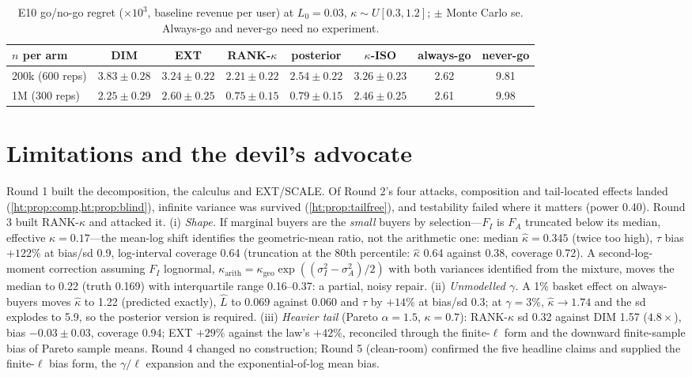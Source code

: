 \begin{table}[htbp]
\centering\small
\caption{E10 go/no-go regret ($\times 10^3$, baseline revenue per user) at $L_0 = 0.03$, $\kappa \sim U[0.3, 1.2]$; $\pm$ Monte Carlo se. Always-go and never-go need no experiment.}
\label{ht:tab:regret}
\begin{tabular}{lccccccc}
\toprule
$n$ per arm & DIM & EXT & RANK-$\kappa$ & posterior & $\kappa$-ISO & always-go & never-go \\
\midrule
200k (600 reps) & $3.83 \pm 0.28$ & $3.24 \pm 0.22$ & $\mathbf{2.21 \pm 0.22}$ & $2.54 \pm 0.22$ & $3.26 \pm 0.23$ & 2.62 & 9.81 \\
1M (300 reps) & $2.25 \pm 0.29$ & $2.60 \pm 0.25$ & $\mathbf{0.75 \pm 0.15}$ & $0.79 \pm 0.15$ & $2.46 \pm 0.25$ & 2.61 & 9.98 \\
\bottomrule
\end{tabular}
\end{table}

\section{Limitations and the devil's advocate}

Round 1 built the decomposition, the calculus and EXT/SCALE. Of Round 2's four attacks, composition and tail-located effects landed (\cref{ht:prop:comp,ht:prop:blind}), infinite variance was survived (\cref{ht:prop:tailfree}), and testability failed where it matters (power 0.40). Round 3 built RANK-$\kappa$ and attacked it. (i) \emph{Shape.} If marginal buyers are the \emph{small} buyers by selection---$F_I$ is $F_A$ truncated below its median, effective $\kappa = 0.17$---the mean-log shift identifies the geometric-mean ratio, not the arithmetic one: median $\hat\kappa = 0.345$ (twice too high), $\tau$ bias $+122\%$ at bias/sd 0.9, log-interval coverage 0.64 (truncation at the 80th percentile: $\hat\kappa$ 0.64 against 0.38, coverage 0.72). A second-log-moment correction assuming $F_I$ lognormal, $\kappa_{\mathrm{arith}} = \kappa_{\mathrm{geo}}\exp((\sigma_I^2 - \sigma_A^2)/2)$ with both variances identified from the mixture, moves the median to 0.22 (truth 0.169) with interquartile range 0.16--0.37: a partial, noisy repair. (ii) \emph{Unmodelled $\gamma$.} A 1\% basket effect on always-buyers moves $\hat\kappa$ to 1.22 (predicted exactly), $\hat L$ to 0.069 against 0.060 and $\tau$ by $+14\%$ at bias/sd 0.3; at $\gamma = 3\%$, $\hat\kappa \to 1.74$ and the sd explodes to 5.9, so the posterior version is required. (iii) \emph{Heavier tail} (Pareto $\alpha = 1.5$, $\kappa = 0.7$): RANK-$\kappa$ sd 0.32 against DIM 1.57 ($4.8\times$), bias $-0.03 \pm 0.03$, coverage 0.94; EXT $+29\%$ against the law's $+42\%$, reconciled through the finite-$\ell$ form and the downward finite-sample bias of Pareto sample means. Round 4 changed no construction; Round 5 (clean-room) confirmed the five headline claims and supplied the finite-$\ell$ bias form, the $\gamma/\ell$ expansion and the exponential-of-log mean bias.

